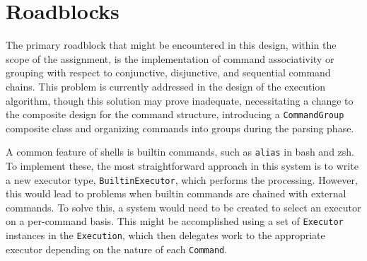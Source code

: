\documentclass{article}
\begin{document}
  \section{Roadblocks}

  The primary roadblock that might be encountered in this design, within
  the scope of the assignment, is the implementation of command
  associativity or grouping with respect to conjunctive, disjunctive,
  and sequential command chains.  This problem is currently addressed in
  the design of the execution algorithm, though this solution may prove
  inadequate, necessitating a change to the composite design for the
  command structure, introducing a \texttt{CommandGroup} composite class
  and organizing commands into groups during the parsing phase.

  A common feature of shells is builtin commands, such as \texttt{alias}
  in bash and zsh.  To implement these, the most straightforward
  approach in this system is to write a new executor type,
  \texttt{BuiltinExecutor}, which performs the processing.  However,
  this would lead to problems when builtin commands are chained with
  external commands.  To solve this, a system would need to be created
  to select an executor on a per-command basis.  This might be
  accomplished using a set of \texttt{Executor} instances in the
  \texttt{Execution}, which then delegates work to the appropriate
  executor depending on the nature of each \texttt{Command}.
\end{document}
